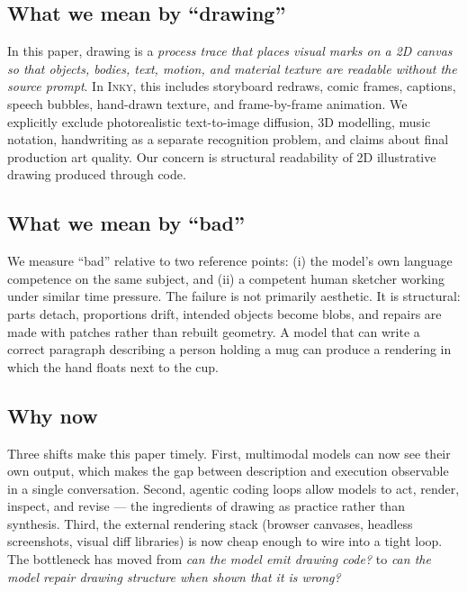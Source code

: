 \documentclass[10pt,twocolumn]{article}
\newcommand{\inky}{\textsc{Inky}}
\begin{document}
\subsection{What we mean by ``drawing''}

In this paper, drawing is a \emph{process trace that places visual
marks on a 2D canvas so that objects, bodies, text, motion, and
material texture are readable without the source prompt}. In \inky{},
this includes storyboard redraws, comic frames, captions, speech
bubbles, hand-drawn texture, and frame-by-frame animation. We
explicitly exclude photorealistic text-to-image diffusion, 3D
modelling, music notation, handwriting as a separate recognition
problem, and claims about final production art quality. Our concern
is structural readability of 2D illustrative drawing produced through
code.

\subsection{What we mean by ``bad''}

We measure ``bad'' relative to two reference points: (i) the model's
own language competence on the same subject, and (ii) a competent
human sketcher working under similar time pressure. The failure is
not primarily aesthetic. It is structural: parts detach, proportions
drift, intended objects become blobs, and repairs are made with
patches rather than rebuilt geometry. A model that can write a
correct paragraph describing a person holding a mug can produce a
rendering in which the hand floats next to the cup.

\subsection{Why now}

Three shifts make this paper timely. First, multimodal models can now
see their own output, which makes the gap between description and
execution observable in a single conversation. Second, agentic coding
loops allow models to act, render, inspect, and revise --- the
ingredients of drawing as practice rather than synthesis. Third, the
external rendering stack (browser canvases, headless screenshots,
visual diff libraries) is now cheap enough to wire into a tight loop.
The bottleneck has moved from \emph{can the model emit drawing code?}
to \emph{can the model repair drawing structure when shown that it is
wrong?}

\end{document}
